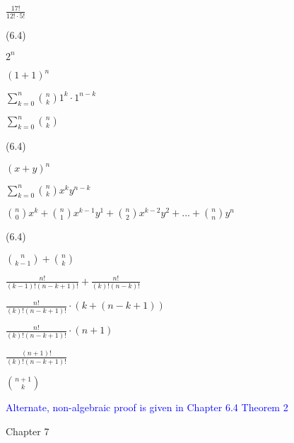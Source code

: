 \documentclass{exam}
\begin{document}
\begin{questions}
\begin{center}
\(\frac{17!}{12! \cdot 5!}\) 

\end{center}

 (6.4)

\begin{center}

\(2^n\)

\((1+1)^n\)

\(\sum_{k=0}^n {n \choose k} 1^k \cdot 1^{n-k}\)

\(\sum_{k=0}^n {n \choose k}\)

\end{center}

 (6.4)

\begin{center}
\( (x + y)^n \)

\(\sum_{k=0}^n {n \choose k} x^{k} y^{n-k}\)

\( {n \choose 0} x^k + {n \choose 1} x^{k-1}y^1 + {n \choose 2} x^{k-2}y^2 + ... + {n \choose n} y^n \)
\end{center}

 (6.4)

\begin{center}

\( { n \choose k-1 } + { n \choose k } \)

\( \frac{n!}{(k-1)!(n-k+1)!} + \frac{n!}{(k)!(n-k)!} \)

\( \frac{n!}{(k)!(n-k+1)!} \cdot (k + (n - k + 1)) \)

\( \frac{n!}{(k)!(n-k+1)!} \cdot (n + 1) \)

\( \frac{(n+1)!}{(k)!(n-k+1)!} \)

\( {n+1 \choose k} \)

\textcolor{blue}{Alternate, non-algebraic proof is given in Chapter 6.4 Theorem 2}

\end{center}




\vspace{10pt}
{\Large Chapter 7}
\vspace{2pt}


\end{questions}
\end{document}
